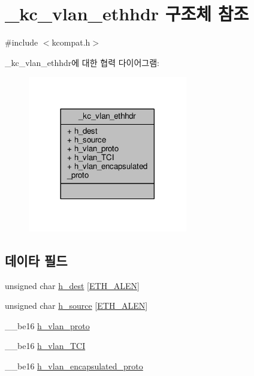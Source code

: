\hypertarget{struct__kc__vlan__ethhdr}{}\section{\+\_\+kc\+\_\+vlan\+\_\+ethhdr 구조체 참조}
\label{struct__kc__vlan__ethhdr}


{\ttfamily \#include $<$kcompat.\+h$>$}



\+\_\+kc\+\_\+vlan\+\_\+ethhdr에 대한 협력 다이어그램\+:
\nopagebreak
\begin{figure}[H]
\begin{center}
\leavevmode
\includegraphics[width=197pt]{struct__kc__vlan__ethhdr__coll__graph}
\end{center}
\end{figure}
\subsection*{데이타 필드}
\begin{DoxyCompactItemize}
\item 
unsigned char \hyperlink{struct__kc__vlan__ethhdr_a4ed9730824f0fec5b744ab5c58090101}{h\+\_\+dest} \mbox{[}\hyperlink{avb__avtp_8h_a9822d89774e0d6ddaa06503950130423}{E\+T\+H\+\_\+\+A\+L\+EN}\mbox{]}
\item 
unsigned char \hyperlink{struct__kc__vlan__ethhdr_a97dd3055fe7dd35d5e54aced21ed67d3}{h\+\_\+source} \mbox{[}\hyperlink{avb__avtp_8h_a9822d89774e0d6ddaa06503950130423}{E\+T\+H\+\_\+\+A\+L\+EN}\mbox{]}
\item 
\+\_\+\+\_\+be16 \hyperlink{struct__kc__vlan__ethhdr_aa20e15fd6c035af3e642fb7d87413435}{h\+\_\+vlan\+\_\+proto}
\item 
\+\_\+\+\_\+be16 \hyperlink{struct__kc__vlan__ethhdr_aa70cf4362df675d9268e3dd238060f29}{h\+\_\+vlan\+\_\+\+T\+CI}
\item 
\+\_\+\+\_\+be16 \hyperlink{struct__kc__vlan__ethhdr_a36530e176eb1042729f476437cde0790}{h\+\_\+vlan\+\_\+encapsulated\+\_\+proto}
\end{DoxyCompactItemize}


